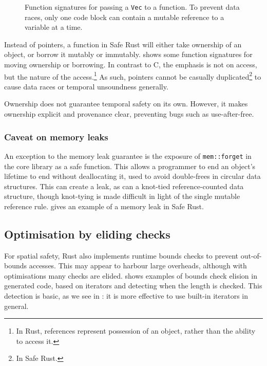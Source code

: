 \documentclass[dissertation.tex]{subfiles}
\begin{document}
\begin{figure}[ht]
    
    \caption{
        Function signatures for passing a \texttt{Vec} to a function.
        To prevent data races, only one code block can contain a mutable
        reference to a variable at a time.
    }
    \label{lst:rust-ownership}
\end{figure}

Instead of pointers, a function in Safe Rust will either take ownership
of an object, or borrow it mutably or immutably.
 shows some function signatures for
moving ownership or borrowing.
In contrast to C, the emphasis is not on access, but the nature of the
access.\footnote{In Rust, references represent possession of an object,
rather than the ability to access it.}
As such, pointers cannot be casually duplicated\footnote{In Safe Rust.}
to cause data races or temporal unsoundness generally.

Ownership does not guarantee temporal safety on its own.
However, it makes ownership explicit and provenance clear, preventing
bugs such as use-after-free.

\subsubsection{Caveat on memory leaks}
An exception to the memory leak guarantee is the exposure of
\texttt{mem::forget} in the core library as a safe function.
This allows a programmer to end an object's lifetime to end without
deallocating it, used to avoid double-frees in circular data structures.
This can create a leak, as can a knot-tied reference-counted data
structure, though knot-tying is made difficult in light of the single
mutable reference rule.
 gives an example of a memory leak in
Safe Rust.


\subsection{Optimisation by eliding checks}
\label{sec:rust-elision}

For spatial safety, Rust also implements runtime bounds checks to
prevent out-of-bounds accesses.
This may appear to harbour large overheads, although with optimisations
many checks are elided.
 shows examples of bounds check elision in
generated code, based on iterators and detecting when the length is
checked.
This detection is basic, as we see in : it
is more effective to use built-in iterators in general.
\end{document}
